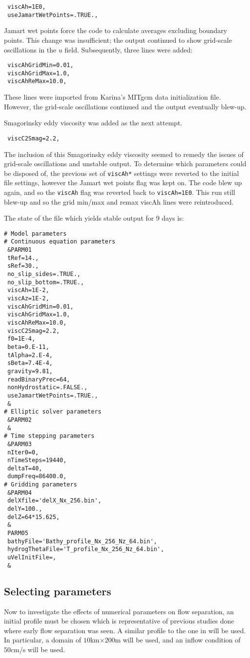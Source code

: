 \documentclass[11pt]{article}
\begin{document}
\begin{lstlisting}
 viscAh=1E0,
 useJamartWetPoints=.TRUE.,
\end{lstlisting}

Jamart wet points force the code to calculate averages excluding boundary points. This change was insufficient; the output continued to show grid-scale oscillations in the $u$ field. Subsequently, three lines were added:

\begin{lstlisting}
 viscAhGridMin=0.01,
 viscAhGridMax=1.0,
 viscAhReMax=10.0,
\end{lstlisting}

These lines were imported from Karina's MITgcm data initialization file. However, the grid-scale oscillations continued and the output eventually blew-up. 

Smagorinsky eddy viscosity was added as the next attempt.

\begin{lstlisting}
 viscC2Smag=2.2,
\end{lstlisting}

The inclusion of this Smagorinsky eddy viscosity seemed to remedy the issues of grid-scale oscillations and unstable output. To determine which parameters could be disposed of, the previous set of \texttt{viscAh*} settings were reverted to the initial file settings, however the Jamart wet points flag was kept on. The code blew up again, and so the \texttt{viscAh} flag was reverted back to \texttt{viscAh=1E0}. This run still blew-up and so the grid min/max and remax viscAh lines were reintroduced.

The state of the file which yields stable output for 9 days is:
\begin{lstlisting}
# Model parameters
# Continuous equation parameters
 &PARM01
 tRef=14.,
 sRef=30.,
 no_slip_sides=.TRUE.,
 no_slip_bottom=.TRUE.,
 viscAh=1E-2,
 viscAz=1E-2,
 viscAhGridMin=0.01,
 viscAhGridMax=1.0,
 viscAhReMax=10.0,
 viscC2Smag=2.2,
 f0=1E-4,
 beta=0.E-11,
 tAlpha=2.E-4,
 sBeta=7.4E-4,
 gravity=9.81,
 readBinaryPrec=64,
 nonHydrostatic=.FALSE.,
 useJamartWetPoints=.TRUE.,
 &
# Elliptic solver parameters
 &PARM02
 &
# Time stepping parameters
 &PARM03
 nIter0=0,
 nTimeSteps=19440,
 deltaT=40,
 dumpFreq=86400.0,
# Gridding parameters
 &PARM04
 delXfile='delX_Nx_256.bin',
 delY=100.,
 delZ=64*15.625,
 &
 PARM05
 bathyFile='Bathy_profile_Nx_256_Nz_64.bin',
 hydrogThetaFile='T_profile_Nx_256_Nz_64.bin',
 uVelInitFile=,
 &
\end{lstlisting}

\subsection{Selecting parameters}

Now to investigate the effects of numerical parameters on flow separation, an initial profile must be chosen which is representative of previous studies done where early flow separation was seen. A similar profile to the one in \cite{cummins} will be used. In particular, a domain of $10$km$\times 200$m will be used, and an inflow condition of $50$cm/s will be used.




\end{document}

